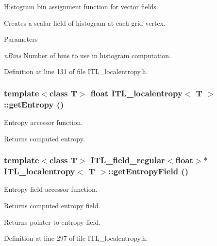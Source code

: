 Histogram bin assignment function for vector fields. 

Creates a scalar field of histogram at each grid vertex. 
\begin{DoxyParams}{Parameters}
\item[{\em nBins}]Number of bins to use in histogram computation. \end{DoxyParams}


Definition at line 131 of file ITL\_\-localentropy.h.

\hypertarget{classITL__localentropy_a9605667a7f4428865d49c00237fffe53}{
\subsubsection[{getEntropy}]{\setlength{\rightskip}{0pt plus 5cm}template$<$class T$>$ float {\bf ITL\_\-localentropy}$<$ T $>$::getEntropy ()}}
\label{classITL__localentropy_a9605667a7f4428865d49c00237fffe53}


Entropy accessor function. 

\begin{DoxyReturn}{Returns}
computed entropy. 
\end{DoxyReturn}
\hypertarget{classITL__localentropy_aaf4dbe3576fe662d3823d6e379618804}{
\subsubsection[{getEntropyField}]{\setlength{\rightskip}{0pt plus 5cm}template$<$class T$>$ {\bf ITL\_\-field\_\-regular}$<$float$>$$\ast$ {\bf ITL\_\-localentropy}$<$ T $>$::getEntropyField ()}}
\label{classITL__localentropy_aaf4dbe3576fe662d3823d6e379618804}


Entropy field accessor function. 

Returns computed entropy field. \begin{DoxyReturn}{Returns}
pointer to entropy field. 
\end{DoxyReturn}


Definition at line 297 of file ITL\_\-localentropy.h.



